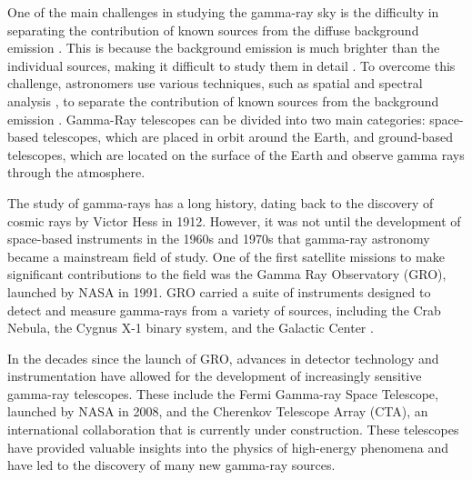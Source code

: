 One of the main challenges in studying the gamma-ray sky is the difficulty in separating the contribution of known sources from the diffuse background emission \cite{Ackermann2015}. This is because the background emission is much brighter than the individual sources, making it difficult to study them in detail \cite{Abdo}. To overcome this challenge, astronomers use various techniques, such as spatial and spectral analysis \cite{Kelley2020}, to separate the contribution of known sources from the background emission \cite{Ackermann2015}.
Gamma-Ray telescopes can be divided into two main categories: space-based telescopes, which are placed in orbit around the Earth, and ground-based telescopes, which are located on the surface of the Earth and observe gamma rays through the atmosphere. 

The study of gamma-rays has a long history, dating back to the discovery of cosmic rays by Victor Hess in 1912. However, it was not until the development of space-based instruments in the 1960s and 1970s that gamma-ray astronomy became a mainstream field of study. One of the first satellite missions to make significant contributions to the field was the Gamma Ray Observatory (GRO), launched by NASA in 1991. GRO carried a suite of instruments designed to detect and measure gamma-rays from a variety of sources, including the Crab Nebula, the Cygnus X-1 binary system, and the Galactic Center \cite{fichtel1994egret}.

In the decades since the launch of GRO, advances in detector technology and instrumentation have allowed for the development of increasingly sensitive gamma-ray telescopes. These include the Fermi Gamma-ray Space Telescope, launched by NASA in 2008, and the Cherenkov Telescope Array (CTA), an international collaboration that is currently under construction. These telescopes have provided valuable insights into the physics of high-energy phenomena and have led to the discovery of many new gamma-ray sources.


